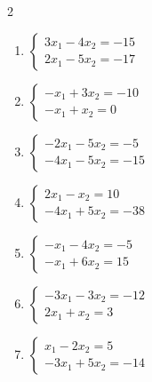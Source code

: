 \begin{multicols}{2}
\begin{enumerate}[label=\arabic*., leftmargin=*]
\item $\begin{cases}3x_1-4x_2=-15\\2x_1-5x_2=-17\end{cases}$
\item $\begin{cases}-x_1+3x_2=-10\\-x_1+x_2=0\end{cases}$
\item $\begin{cases}-2x_1-5x_2=-5\\-4x_1-5x_2=-15\end{cases}$
\item $\begin{cases}2x_1-x_2=10\\-4x_1+5x_2=-38\end{cases}$
\item $\begin{cases}-x_1-4x_2=-5\\-x_1+6x_2=15\end{cases}$
\item $\begin{cases}-3x_1-3x_2=-12\\2x_1+x_2=3\end{cases}$
\item $\begin{cases}x_1-2x_2=5\\-3x_1+5x_2=-14\end{cases}$
\end{enumerate}
\end{multicols}

